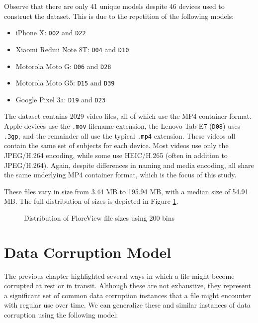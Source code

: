 Observe that there are only 41 unique models despite 46 devices used to construct the dataset. This is due to the repetition of the following models:

\begin{itemize}
    \item iPhone X: \texttt{D02} and \texttt{D22}
    \item Xiaomi Redmi Note 8T: \texttt{D04} and \texttt{D10}
    \item Motorola Moto G: \texttt{D06} and \texttt{D28}
    \item Motorola Moto G5: \texttt{D15} and \texttt{D39}
    \item Google Pixel 3a: \texttt{D19} and \texttt{D23}
\end{itemize}

The dataset contains 2029 video files, all of which use the MP4 container format. Apple devices use the \texttt{.mov} filename extension, the Lenovo Tab E7 (\texttt{D08}) uses \texttt{.3gp}, and the remainder all use the typical \texttt{.mp4} extension. These videos all contain the same set of subjects for each device. Most videos use only the JPEG/H.264 encoding, while some use HEIC/H.265 (often in addition to JPEG/H.264). Again, despite differences in naming and media encoding, all share the same underlying MP4 container format, which is the focus of this study.

These files vary in size from 3.44 MB to 195.94 MB, with a median size of 54.91 MB. The full distribution of sizes is depicted in Figure \ref{fig:size-hist}.

\begin{figure}
    \begin{center}
        
    \end{center}
    \caption{Distribution of FloreView file sizes using 200 bins}
    \label{fig:size-hist}
\end{figure}

\section{Data Corruption Model}

The previous chapter highlighted several ways in which a file might become corrupted at rest or in transit. Although these are not exhaustive, they represent a significant set of common data corruption instances that a file might encounter with regular use over time. We can generalize these and similar instances of data corruption using the following model:


